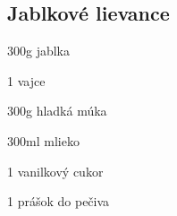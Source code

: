 
\setcounter{step}{0}
\subsection{Jablkové lievance}

\begin{ingredient}
\begin{main}
	\item 300g jablka
	\item 1 vajce
	\item 300g hladká múka
	\item 300ml mlieko
	\item 1 vanilkový cukor
	\item 1 prášok do pečiva
\end{main}
\end{ingredient}%
\begin{recipe}




\end{recipe}

\begin{notes}

\end{notes}	
